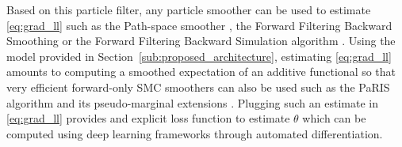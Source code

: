 \documentclass{article}
\begin{document}
Based on this particle filter, any particle smoother can be used to estimate \eqref{eq:grad_ll} such as the Path-space smoother \cite{Kitagawa1996}, the Forward Filtering Backward Smoothing \cite{Doucet2000OnSM} or the Forward Filtering Backward Simulation algorithm \cite{Godsill2004MonteCS}.
Using the model provided in Section~\ref{sub:proposed_architecture}, estimating \eqref{eq:grad_ll} amounts to computing a smoothed expectation of an additive functional so that very efficient forward-only SMC smoothers can also be used such as the PaRIS algorithm and its pseudo-marginal extensions \cite{Olsson2014EfficientPO,gloaguen2022pseudo}.
Plugging such an estimate in \ref{eq:grad_ll} provides and explicit loss function to estimate $\theta$ which can be computed using deep learning frameworks through automated differentiation. %

\end{document}
